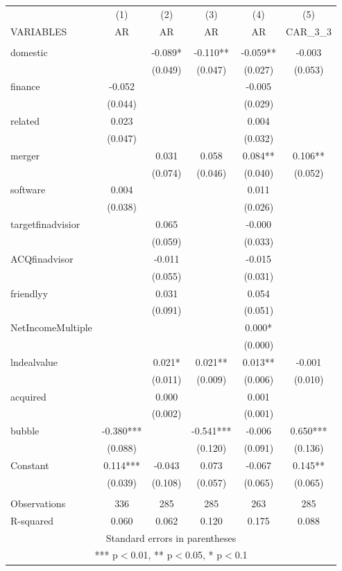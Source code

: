 
\setlength{\pdfpagewidth}{8.5in} \setlength{\pdfpageheight}{11in}

\begin{tabular}{lccccc} \hline
 & (1) & (2) & (3) & (4) & (5) \\
VARIABLES & AR & AR & AR & AR & CAR\_3\_3 \\ \hline
 &  &  &  &  &  \\
domestic &  & -0.089* & -0.110** & -0.059** & -0.003 \\
 &  & (0.049) & (0.047) & (0.027) & (0.053) \\
finance & -0.052 &  &  & -0.005 &  \\
 & (0.044) &  &  & (0.029) &  \\
related & 0.023 &  &  & 0.004 &  \\
 & (0.047) &  &  & (0.032) &  \\
merger &  & 0.031 & 0.058 & 0.084** & 0.106** \\
 &  & (0.074) & (0.046) & (0.040) & (0.052) \\
software & 0.004 &  &  & 0.011 &  \\
 & (0.038) &  &  & (0.026) &  \\
targetfinadvisior &  & 0.065 &  & -0.000 &  \\
 &  & (0.059) &  & (0.033) &  \\
ACQfinadvisor &  & -0.011 &  & -0.015 &  \\
 &  & (0.055) &  & (0.031) &  \\
friendlyy &  & 0.031 &  & 0.054 &  \\
 &  & (0.091) &  & (0.051) &  \\
NetIncomeMultiple &  &  &  & 0.000* &  \\
 &  &  &  & (0.000) &  \\
lndealvalue &  & 0.021* & 0.021** & 0.013** & -0.001 \\
 &  & (0.011) & (0.009) & (0.006) & (0.010) \\
acquired &  & 0.000 &  & 0.001 &  \\
 &  & (0.002) &  & (0.001) &  \\
bubble & -0.380*** &  & -0.541*** & -0.006 & 0.650*** \\
 & (0.088) &  & (0.120) & (0.091) & (0.136) \\
Constant & 0.114*** & -0.043 & 0.073 & -0.067 & 0.145** \\
 & (0.039) & (0.108) & (0.057) & (0.065) & (0.065) \\
 &  &  &  &  &  \\
Observations & 336 & 285 & 285 & 263 & 285 \\
 R-squared & 0.060 & 0.062 & 0.120 & 0.175 & 0.088 \\ \hline
\multicolumn{6}{c}{ Standard errors in parentheses} \\
\multicolumn{6}{c}{ *** p$<$0.01, ** p$<$0.05, * p$<$0.1} \\
\end{tabular}

